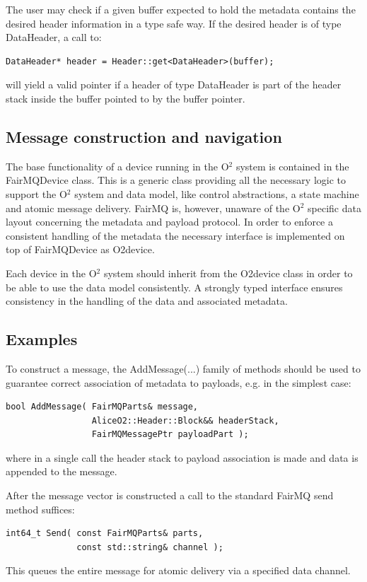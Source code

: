 \documentclass[a4paper,twoside]{article}
\def\O2{O$^2$}
\begin{document}
The user may check if a given buffer expected to hold the metadata contains the desired header information in a type safe way. If the desired header is of type DataHeader, a call to:
\begin{lstlisting}
DataHeader* header = Header::get<DataHeader>(buffer);
\end{lstlisting}

will yield a valid pointer if a header of type DataHeader is part of the header stack inside the buffer pointed to by the buffer pointer.

\subsection{Message construction and navigation}

The base functionality of a device running in the \O2 system is contained in the FairMQDevice class. This is a generic class providing all the necessary logic to support the \O2 system and data model, like control abstractions, a state machine and atomic message delivery. FairMQ is, however, unaware of the \O2 specific data layout concerning the metadata and payload protocol. In order to enforce a consistent handling of the metadata the necessary interface is implemented on top of FairMQDevice as O2device.

Each device in the \O2 system should inherit from the O2device class in order to be able to use the data model consistently. A strongly typed interface ensures consistency in the handling of the data and associated metadata.

\subsection{Examples}
To construct a message, the AddMessage(...) family of methods should be used to guarantee correct association of metadata to payloads, e.g. in the simplest case:
\begin{lstlisting}
bool AddMessage( FairMQParts& message,
                 AliceO2::Header::Block&& headerStack,
                 FairMQMessagePtr payloadPart );
\end{lstlisting}
where in a single call the header stack to payload association is made and data is appended to the message.

After the message vector is constructed a call to the standard FairMQ send method suffices:
\begin{lstlisting}
int64_t Send( const FairMQParts& parts,
              const std::string& channel );
\end{lstlisting}
This queues the entire message for atomic delivery via a specified data channel.
\end{document}
